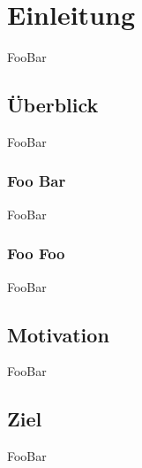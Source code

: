 \chapter{Einleitung}
FooBar\\

\section{\"Uberblick}
FooBar\\

\subsection{Foo Bar}
FooBar\\

\subsection{Foo Foo}
FooBar\\

\section{Motivation}
FooBar\\

\section{Ziel}
FooBar\\
